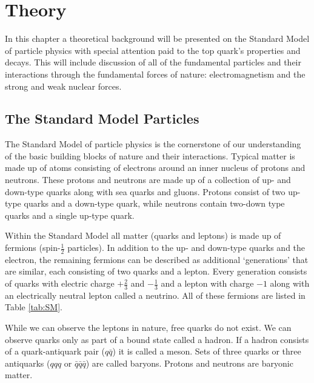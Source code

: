 
\chapter{Theory}
\label{ch:Theory}

In this chapter a theoretical background will be presented on the Standard Model of particle physics with special attention paid to the top quark's properties and decays.  This will include discussion of all of the fundamental particles and their interactions through the fundamental forces of nature: electromagnetism and the strong and weak nuclear forces.

\section{The Standard Model Particles}
\label{SMParticles}
The Standard Model of particle physics is the cornerstone of our understanding of the basic building blocks of nature and their interactions.  Typical matter is made up of atoms consisting of electrons around an inner nucleus of protons and neutrons.  These protons and neutrons are made up of a collection of up- and down-type quarks along with sea quarks and gluons.  Protons consist of two up-type quarks and a down-type quark, while neutrons contain two-down type quarks and a single up-type quark.  

Within the Standard Model all matter (quarks and leptons) is made up of fermions (spin-$\frac{1}{2}$ particles).  In addition to the up- and down-type quarks and the electron, the remaining fermions can be described as additional `generations' that are similar, each consisting of two quarks and a lepton.  Every generation consists of quarks with electric charge $+\frac{2}{3}$ and $-\frac{1}{3}$ and a lepton with charge $-1$ along with an electrically neutral lepton called a neutrino.  All of these fermions are listed in Table \ref{tab:SM}.  

While we can observe the leptons in nature, free quarks do not exist.  We can observe quarks only as part of a bound state called a hadron.  If a hadron consists of a quark-antiquark pair ($q\bar{q}$) it is called a meson.  Sets of three quarks or three antiquarks ($qqq$ or $\bar{q}\bar{q}\bar{q}$) are called baryons.  Protons and neutrons are baryonic matter.

